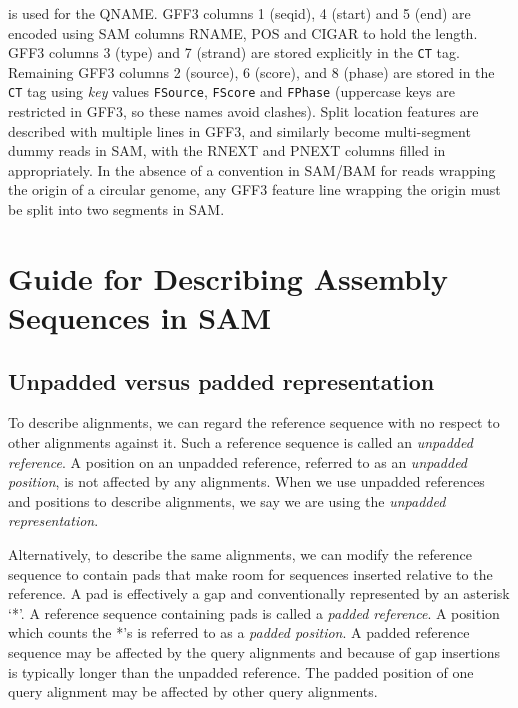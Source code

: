 \documentclass[10pt]{article}
\begin{document}
\begin{enumerate}
\begin{enumerate}[label=\arabic*]
  is used for the QNAME. GFF3 columns 1 (seqid), 4 (start) and 5 (end)
  are encoded using SAM columns RNAME, POS and CIGAR to hold the length.
  GFF3 columns 3 (type) and 7 (strand) are stored explicitly in the
  {\tt CT} tag. Remaining GFF3 columns 2 (source), 6 (score), and
  8 (phase) are stored in the {\tt CT} tag using \emph{key} values
  {\tt FSource}, {\tt FScore} and {\tt FPhase} (uppercase keys are
  restricted in GFF3, so these names avoid clashes). Split location
  features are described with multiple lines in GFF3, and similarly
  become multi-segment dummy reads in SAM, with the {\sf RNEXT} and
  {\sf PNEXT} columns filled in appropriately. In the absence of a
  convention in SAM/BAM for reads wrapping the origin of a circular
  genome, any GFF3 feature line wrapping the origin must be split into
  two segments in SAM.
  \end{enumerate}
\end{enumerate}

\section{Guide for Describing Assembly Sequences in SAM}

\subsection{Unpadded versus padded representation}

To describe alignments, we can regard the reference sequence with no respect to
other alignments against it.  Such a reference sequence is called an
\emph{unpadded reference}. A position on an unpadded reference, referred to
as an \emph{unpadded position}, is not affected by any alignments. When we use
unpadded references and positions to describe alignments, we say we are using
the \emph{unpadded representation}.

Alternatively, to describe the same alignments, we can modify the reference
sequence to contain pads that make room for sequences inserted relative to the
reference. A pad is effectively a gap and conventionally represented by an
asterisk `*'.  A reference sequence containing pads is called a \emph{padded
reference}. A position which counts the *'s is referred to as a \emph{padded
position}. A padded reference sequence may be affected by the query alignments
and because of gap insertions is typically longer than the unpadded reference.
The padded position of one query alignment may be affected by other query
alignments.
\end{document}
